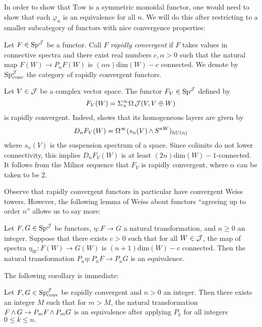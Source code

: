 In order to show that $\text{Tow}$ is a symmetric monoidal functor, one would need to show that each $\varphi_n$ is an equivalence for all $n$.  We will do this after restricting to a smaller subcategory of functors with nice convergence properties:

\begin{dfn}
Let $F\in \operatorname{\text{Sp}}^{\operatorname{\mathcal{J}}}$ be a functor.  Call $F$ \emph{rapidly convergent} if $F$ takes values in connective spectra and there exist real numbers $c,\alpha>0$ such that the natural map $F(W) \to P_nF(W)$ is $(\alpha n)\text{dim}(W) - c$ connected.  We denote by $\operatorname{\text{Sp}}^{\operatorname{\mathcal{J}}}_{\text{conv}}$ the category of rapidly convergent functors.  
\end{dfn}

\begin{exm} \label{ex:aronefunctor}
Let $V\in \operatorname{\mathcal{J}}$ be a complex vector space.  
The functor $F_V\in \operatorname{\text{Sp}}^{\operatorname{\mathcal{J}}}$ defined by $$F_V(W) = \Sigma^{\infty}_+ \Omega \operatorname{\mathcal{J}}(V, V\oplus W)$$ is rapidly convergent.  Indeed, \cite{Arone} shows that its homogeneous layers are given by $$D_nF_V(W) = \Omega^{\infty}(s_n(V) \operatorname{\wedge} S^{nW})_{hU(n)}$$ where $s_n(V)$ is the suspension spectrum of a space.  Since colimits do not lower connectivity, this implies $D_nF_V(W)$ is at least $(2n)\text{dim}(W)-1$-connected.  It follows from the Milnor sequence that $F_V$ is rapidly convergent, where $\alpha$ can be taken to be $2$.  
\end{exm}

Observe that rapidly convergent functors in particular have convergent Weiss towers.  However, the following lemma of Weiss about functors ``agreeing up to order $n$'' allows us to say more:

\begin{lem}\label{lem:ordernagree}%
Let $F,G\in \operatorname{\text{Sp}}^{\operatorname{\mathcal{J}}}$ be functors, $\eta: F\to G$ a natural transformation, and $n\geq 0$ an integer.  Suppose that there exists $c>0$ such that for all $W\in \operatorname{\mathcal{J}}$, the map of spectra $\eta_W: F(W) \to G(W)$ is $(n+1)\text{dim}(W) -c$ connected.  Then the natural transformation $P_n\eta: P_n F\to P_n G$ is an equivalence.  
\end{lem}

The following corollary is immediate:

\begin{cor} \label{cor:rapidconv}
Let $F,G\in \operatorname{\text{Sp}}^{\operatorname{\mathcal{J}}}_{\text{conv}}$ be rapidly convergent and $n>0$ an integer.  Then there exists an integer $M$ such that for $m>M$, the natural transformation $F\operatorname{\wedge} G \to P_m F\operatorname{\wedge} P_m G$ is an equivalence after applying $P_k$ for all integers $0\leq k \leq n.$  
\end{cor}

